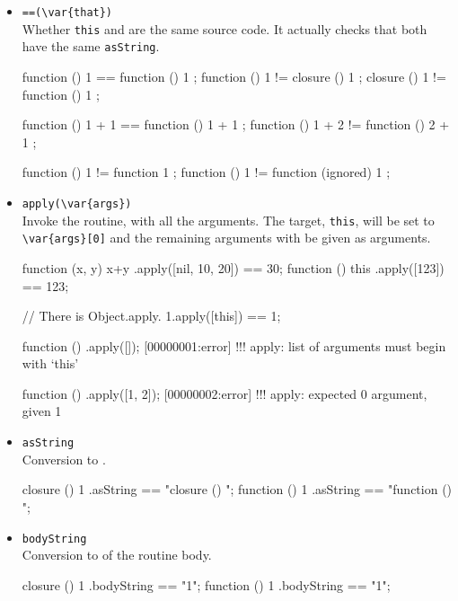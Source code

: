 \begin{itemize}
\item \lstinline|==(\var{that})|\\
  Whether \lstinline|this| and  are the same source code.
  It actually checks that both have the same \lstinline|asString|.
\begin{urbiassert}
function () { 1 } == function () { 1 };
function () { 1 } != closure  () { 1 };
closure  () { 1 } != function () { 1 };

function () { 1 + 1 } == function () { 1 + 1 };
function () { 1 + 2 } != function () { 2 + 1 };

function () { 1 } != function { 1 };
function () { 1 } != function (ignored) { 1 };
\end{urbiassert}

\item \lstinline|apply(\var{args})|\\
  Invoke the routine, with all the arguments.  The target,
  \lstinline|this|, will be set to \lstinline|\var{args}[0]| and the
  remaining arguments with be given as arguments.
\begin{urbiassert}
function (x, y) { x+y }.apply([nil, 10, 20]) == 30;
function () { this }.apply([123]) == 123;

// There is Object.apply.
1.apply([this]) == 1;
\end{urbiassert}
\begin{urbiscript}
function () {}.apply([]);
[00000001:error] !!! apply: list of arguments must begin with `this'

function () {}.apply([1, 2]);
[00000002:error] !!! apply: expected 0 argument, given 1
\end{urbiscript}

\item \lstinline|asString|\\
  Conversion to .
\begin{urbiassert}
closure  () { 1 }.asString == "closure () {\n}";
function () { 1 }.asString == "function () {\n}";
\end{urbiassert}

\item \lstinline|bodyString|\\
  Conversion to  of the routine body.
\begin{urbiassert}
closure  () { 1 }.bodyString == "1";
function () { 1 }.bodyString == "1";
\end{urbiassert}

\end{itemize}

